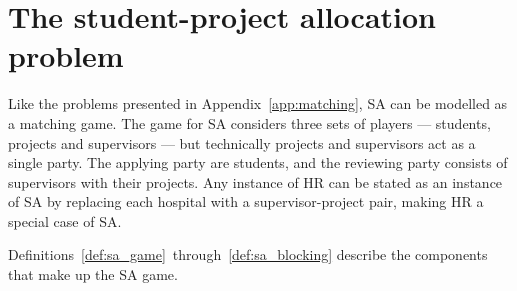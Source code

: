 \section{The student-project allocation problem}\label{sec:allocation}

Like the problems presented in Appendix~\ref{app:matching}, SA can be modelled
as a matching game. The game for SA considers three sets of players ---
students, projects and supervisors --- but technically projects and supervisors
act as a single party. The applying party are students, and the reviewing party
consists of supervisors with their projects. Any instance of HR can be stated as
an instance of SA by replacing each hospital with a supervisor-project pair,
making HR a special case of SA.

Definitions~\ref{def:sa_game}~through~\ref{def:sa_blocking} describe the
components that make up the SA game.

